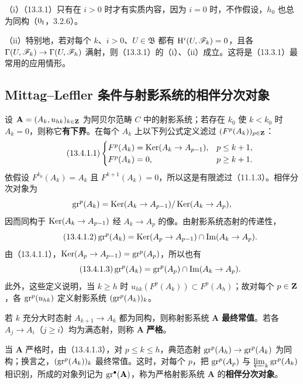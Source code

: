 （i）（13.3.1）只有在 $i>0$ 时才有实质内容，因为 $i=0$ 时，不作假设，$h_0$ 也总为同构（$0_{\mathrm I}$，3.2.6）。

（ii）特别地，若对每个 $k$、$i>0$、$U\in\mathfrak B$ 都有 $\mathrm H^i(U,\mathscr F_k)=0$，且各 $\Gamma(U,\mathscr F_k)\to\Gamma(U,\mathscr F_h)$ 满射，则（13.3.1）的（i）、（ii）成立。这将是（13.3.1）最常用的应用情形。\par

\subsection{Mittag--Leffler 条件与射影系统的相伴分次对象}
设 $\mathbf A=(A_k,u_{hk})_{k\in\mathbf Z}$ 为阿贝尔范畴 $C$ 中的射影系统；若存在 $k_0$ 使 $k<k_0$ 时 $A_k=0$，则称它\textbf{有下界}。在每个 $A_k$ 上以下列公式定义滤过 $(F^p(A_k))_{p\in\mathbf Z}$：
\begin{equation}\tag{13.4.1.1}
\begin{cases}
F^p(A_k)=\operatorname{Ker}(A_k\to A_{p-1}),&p\leq k+1,\\
F^p(A_k)=0,&p\geq k+1.
\end{cases}
\end{equation}
依假设 $F^{k_0}(A_k)=A_k$ 且 $F^{k+1}(A_k)=0$，所以这是有限滤过（11.1.3）。相伴分次对象为
\[
\operatorname{gr}^p(A_k)=\operatorname{Ker}(A_k\to A_{p-1})/\operatorname{Ker}(A_k\to A_p),
\]
因而同构于 $\operatorname{Ker}(A_k\to A_{p-1})$ 经 $A_k\to A_p$ 的像。由射影系统态射的传递性，
\begin{equation}\tag{13.4.1.2}
\operatorname{gr}^p(A_k)=\operatorname{Ker}(A_p\to A_{p-1})\cap\operatorname{Im}(A_k\to A_p).
\end{equation}
由（13.4.1.1），$\operatorname{Ker}(A_p\to A_{p-1})=\operatorname{gr}^p(A_p)$，所以也有
\begin{equation}\tag{13.4.1.3}
\operatorname{gr}^p(A_k)=\operatorname{gr}^p(A_p)\cap\operatorname{Im}(A_k\to A_p).
\end{equation}
此外，这些定义说明，当 $k\geq h$ 时 $u_{hk}(F^p(A_k))\subset F^p(A_h)$；故对每个 $p\in\mathbf Z$，各 $\operatorname{gr}^p(u_{hk})$ 定义射影系统 $(\operatorname{gr}^p(A_k))_k$。

若 $k$ 充分大时态射 $A_{k+1}\to A_k$ 都为同构，则称射影系统 $\mathbf A$ \textbf{最终常值}。若各 $A_j\to A_i$（$j\geq i$）均为满态射，则称 $\mathbf A$ \textbf{严格}。

当 $\mathbf A$ 严格时，由（13.4.1.3），对 $p\leq k\leq h$，典范态射 $\operatorname{gr}^p(A_h)\to\operatorname{gr}^p(A_k)$ 为同构；换言之，$(\operatorname{gr}^p(A_k))_k$ 最终常值。这时，对每个 $p$，把 $\operatorname{gr}^p(A_p)$ 与 $\varprojlim_k\operatorname{gr}^p(A_k)$ 相识别，所成的对象列记为 $\operatorname{gr}^\bullet(\mathbf A)$，称为严格射影系统 $\mathbf A$ 的\textbf{相伴分次对象}。

